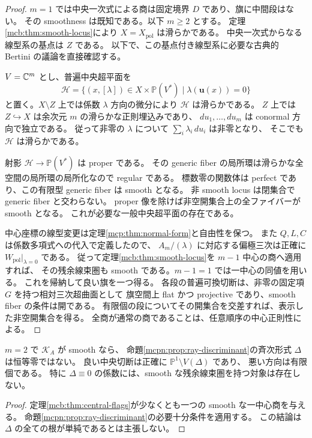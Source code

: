 \begin{proof}
$m=1$ では中央一次式による商は固定境界 $D$ であり、旗に中間段はない。
その smoothness は既知である。以下 $m\ge2$ とする。
定理\ref{mcb:thm:smooth-locus}により $X=X_{\mathrm{pol}}$ は滑らかである。
中央一次式からなる線型系の基点は $Z$ である。
以下で、この基点付き線型系に必要な古典的 Bertini の議論を直接確認する。

$V=\mathbb C^m$ とし、普遍中央超平面を
\[
 \mathscr H=\{(x,[\lambda])\in X\times\mathbb P(V^*)
                               \mid\lambda(\mathbf u(x))=0\}
\]
と置く。$X\setminus Z$ 上では係数 $\lambda$ 方向の微分により $\mathscr H$ は滑らかである。
$Z$ 上では $Z\hookrightarrow X$ は余次元 $m$ の滑らかな正則埋込みであり、
$du_1,\ldots,du_m$ は conormal 方向で独立である。
従って非零の $\lambda$ について $\sum_i\lambda_i\,du_i$ は非零となり、
そこでも $\mathscr H$ は滑らかである。

射影 $\mathscr H\to\mathbb P(V^*)$ は proper である。
その generic fiber の局所環は滑らかな全空間の局所環の局所化なので regular である。
標数零の関数体は perfect であり、この有限型 generic fiber は smooth となる。
非 smooth locus は閉集合で generic fiber と交わらない。
proper 像を除けば非空開集合上の全ファイバーが smooth となる。
これが必要な一般中央超平面の存在である。

中心座標の線型変更は定理\ref{mcp:thm:normal-form}と自由性を保つ。
また $Q,L,C$ は係数多項式への代入で定義したので、
$A_m/(\lambda)$ に対応する偏極三次は正確に $W_{\mathrm{pol}}|_{\lambda=0}$ である。
従って定理\ref{mcb:thm:smooth-locus}を $m-1$ 中心の商へ適用すれば、
その残余線束圏も smooth である。$m-1=1$ では一中心の同値を用いる。
これを帰納して良い旗を一つ得る。
各段の普遍可換切断は、非零の固定項 $G$ を持つ相対三次超曲面として
旗空間上 flat かつ projective であり、smooth fiber の条件は開である。
有限個の段についてその開集合を交差すれば、表示した非空開集合を得る。
全商が通常の商であることは、任意順序の中心正則性による。
\end{proof}

\begin{corollary}
\label{mcb:cor:good-ray}
$m=2$ で $\mathcal K_A$ が smooth なら、
命題\ref{mcpn:prop:ray-discriminant}の斉次形式 $\Delta$ は恒等零ではない。
良い中央切断は正確に $\mathbb P^1\setminus V(\Delta)$ であり、
悪い方向は有限個である。
特に $\Delta\equiv0$ の係数には、smooth な残余線束圏を持つ対象は存在しない。
\end{corollary}

\begin{proof}
定理\ref{mcb:thm:central-flags}が少なくとも一つの smooth な一中心商を与える。
命題\ref{mcpn:prop:ray-discriminant}の必要十分条件を適用する。
この結論は $\Delta$ の全ての根が単純であるとは主張しない。
\end{proof}

